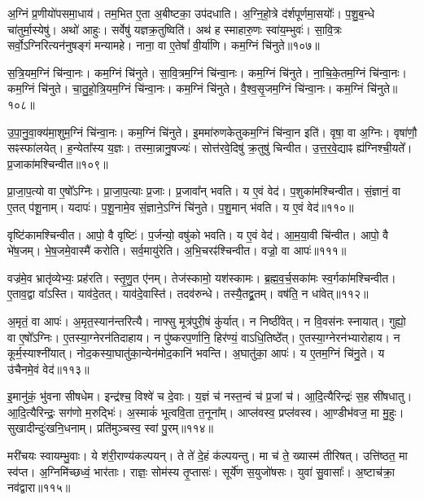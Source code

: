 अ॒ग्निं प्र॒णीयो॑पसमा॒धाय॑। तम॒भित ए॒ता अ॒बीष्टका॒ उप॑दधाति। 
अ॒ग्नि॒हो॒त्रे द॑र्शपूर्णमा॒सयोः᳚। प॒शु॒ब॒न्धे चा॑तुर्मा॒स्येषु॑। 
अथो॑ आहुः। सर्वेषु॑ यज्ञक्र॒तुष्विति॑। 
अथ॑ ह स्माहारु॒णः स्वा॑य॒म्भुवः॑। सा॒वि॒त्रः सर्वो॒ऽग्निरित्यन॑नुषङ्गं मन्यामहे। 
नाना॒ वा ए॒तेषां᳚ वी॒र्या॑णि। कम॒ग्निं चि॑नुते॥१०७॥


स॒त्रि॒यम॒ग्निं चि॑न्वा॒नः। कम॒ग्निं चि॑नुते। 
सा॒वि॒त्रम॒ग्निं चि॑न्वा॒नः। कम॒ग्निं चि॑नुते। 
ना॒चि॒के॒तम॒ग्निं चि॑न्वा॒नः। कम॒ग्निं चि॑नुते। 
चा॒तु॒\ar{}हो॒त्रि॒य\-म॒ग्निं चि॑न्वा॒नः। कम॒ग्निं चि॑नुते। 
वै॒श्व॒सृ॒जम॒ग्निं चि॑न्वा॒नः। कम॒ग्निं चि॑नुते॥१०८॥


उ॒पा॒नु॒वा॒क्य॑मा॒शुम॒ग्निं चि॑न्वा॒नः। कम॒ग्निं चि॑नुते। 
इ॒ममा॑रुणकेतुक\-म॒ग्निं चि॑न्वा॒न इति॑। वृषा॒ वा अ॒ग्निः। 
वृषा॑णौ॒ सꣴस्फा॑लयेत्। ह॒न्येता᳚स्य य॒ज्ञः। 
तस्मा॒न्नानु॒षज्यः॑। सोत्त॑रवे॒दिषु॑ क्र॒तुषु॑ चिन्वीत। 
उ॒त्त॒र॒वे॒द्याꣴ ह्य॑ग्निश्ची॒यते᳚। प्र॒जाका॑मश्चिन्वीत॥१०९॥


प्रा॒जा॒प॒त्यो वा ए॒षो᳚ऽग्निः। प्रा॒जा॒प॒त्याः प्र॒जाः। 
प्र॒जावा᳚न्‌ भवति। य ए॒वं वेद॑। 
प॒शुका॑मश्चिन्वीत। सं॒ज्ञानं॒ वा ए॒तत् प॑शू॒नाम्। 
यदापः॑। प॒शू॒नामे॒व सं॒ज्ञाने॒ऽग्निं चि॑नुते। 
प॒शु॒मान् भ॑वति। य ए॒वं वेद॑॥११०॥


वृष्टि॑कामश्चिन्वीत। आपो॒ वै वृष्टिः॑। 
प॒र्जन्यो॒ व\ur{}षु॑को भवति। य ए॒वं वेद॑। 
आ॒म॒या॒वी चि॑न्वीत। आपो॒ वै भे॑ष॒जम्। 
भे॒ष॒जमे॒वास्मै॑ करोति। सर्व॒मायु॑रेति। 
अ॒भि॒चरꣴ॑श्चिन्वीत। वज्रो॒ वा आपः॑॥१११॥


वज्र॑मे॒व भ्रातृ॑व्येभ्यः॒ प्रह॑रति। स्तृ॒णु॒त ए॑नम्। 
तेज॑स्कामो॒ यश॑स्कामः। ब्र॒ह्म॒व॒र्च॒सका॑मः स्व॒र्गका॑मश्चिन्वीत। 
ए॒ताव॒द्वा वा᳚ऽस्ति। याव॑दे॒तत्। 
याव॑दे॒वास्ति॑। तदव॑रुन्धे। 
तस्यै॒तद्व्र॒तम्। व\ur{}ष॑ति॒ न धा॑वेत्॥११२॥


अ॒मृतं॒ वा आपः॑। अ॒मृत॒स्यान॑न्तरित्यै। 
नाफ्सु मूत्र॑पुरी॒षं कु॑र्यात्। न निष्ठी॑वेत्। 
न वि॒वस॑नः स्नायात्। गुह्यो॒ वा ए॒षो᳚ऽग्निः। 
ए॒तस्या॒ग्नेरन॑तिदाहाय। न पु॑ष्करप॒र्णानि॒ हिर॑ण्यं॒ वाऽधि॒तिष्ठे᳚त्। 
ए॒तस्या॒ग्नेरन॑भ्यारोहाय। न कूर्म॒स्याश्नी॑यात्। 
नोद॒कस्या॒घातु॑का॒न्येन॑\-मोद॒कानि॑ भवन्ति। अ॒घातु॑का॒ आपः॑। 
य ए॒तम॒ग्निं चि॑नु॒ते। य उ॑चैनमे॒वं वेद॑॥११३॥\anuvakamend


इ॒मानु॑कं॒ भु॑वना सीषधेम। इन्द्र॑श्च॒ विश्वे॑ च दे॒वाः। 
य॒ज्ञं च॑ नस्त॒न्वं च॑ प्र॒जां च॑। आ॒दि॒त्यैरिन्द्रः॑ स॒ह सी॑षधातु। 
आ॒दि॒त्यैरिन्द्रः॒ सग॑णो म॒रुद्भिः॑। अ॒स्माकं॑ भूत्ववि॒ता त॒नूना᳚म्। 
आप्ल॑वस्व॒ प्रप्ल॑वस्व। आ॒ण्डीभ॑वज॒ मा मु॒हुः। 
सुखादीन्दुः॑खनि॒धनाम्। प्रति॑मुञ्चस्व॒ स्वां पु॒रम्॥११४॥


मरी॑चयः स्वायम्भु॒वाः। ये श॑री॒राण्य॑कल्पयन्। 
ते ते॑ दे॒हं क॑ल्पयन्तु। मा च॑ ते॒ ख्यास्म॑ तीरिषत्। 
उत्ति॑ष्ठत॒ मा स्व॑प्त। अ॒ग्निमि॑च्छध्वं॒ भार॑ताः। 
राज्ञः॒ सोम॑स्य तृ॒प्तासः॑। सूर्ये॑ण स॒युजो॑षसः। 
युवा॑ सु॒वासाः᳚। अ॒ष्टाच॑क्रा॒ नव॑द्वारा॥११५॥


